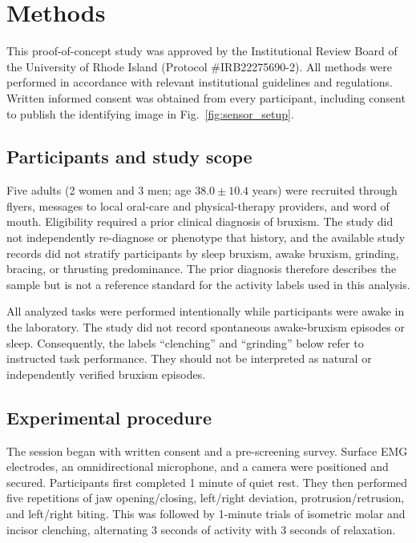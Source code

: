 \documentclass[pdflatex,sn-nature,iicol]{sn-jnl}
\begin{document}
\section{Methods}

This proof-of-concept study was approved by the Institutional Review Board of the University of Rhode Island (Protocol \#IRB22275690-2). All methods were performed in accordance with relevant institutional guidelines and regulations. Written informed consent was obtained from every participant, including consent to publish the identifying image in Fig.~\ref{fig:sensor_setup}.

\subsection{Participants and study scope}

Five adults (2 women and 3 men; age $38.0 \pm 10.4$ years) were recruited through flyers, messages to local oral-care and physical-therapy providers, and word of mouth. Eligibility required a prior clinical diagnosis of bruxism. The study did not independently re-diagnose or phenotype that history, and the available study records did not stratify participants by sleep bruxism, awake bruxism, grinding, bracing, or thrusting predominance. The prior diagnosis therefore describes the sample but is not a reference standard for the activity labels used in this analysis.

All analyzed tasks were performed intentionally while participants were awake in the laboratory. The study did not record spontaneous awake-bruxism episodes or sleep. Consequently, the labels ``clenching'' and ``grinding'' below refer to instructed task performance. They should not be interpreted as natural or independently verified bruxism episodes.

\subsection{Experimental procedure}

The session began with written consent and a pre-screening survey. Surface EMG electrodes, an omnidirectional microphone, and a camera were positioned and secured. Participants first completed 1 minute of quiet rest. They then performed five repetitions of jaw opening/closing, left/right deviation, protrusion/retrusion, and left/right biting. This was followed by 1-minute trials of isometric molar and incisor clenching, alternating 3 seconds of activity with 3 seconds of relaxation.
\end{document}
